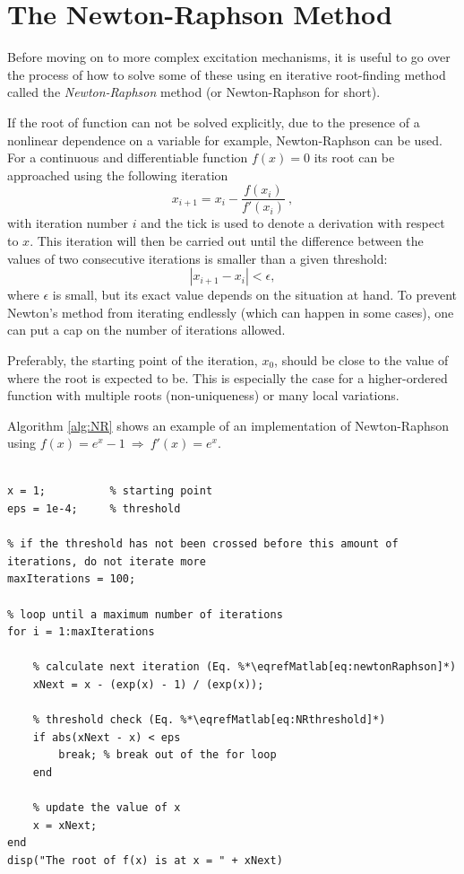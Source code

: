 \section{The Newton-Raphson Method}\label{sec:newtonRaphson}
Before moving on to more complex excitation mechanisms, it is useful to go over the process of how to solve some of these using en iterative root-finding method called the \textit{Newton-Raphson} method (or Newton-Raphson for short). 

If the root of function can not be solved explicitly, due to the presence of a nonlinear dependence on a variable  for example, Newton-Raphson can be used. For a continuous and differentiable function $f(x) = 0$ its root can be approached using the following iteration
\begin{equation}\label{eq:newtonRaphson}
    x_{i+1} = x_i - \frac{f(x_i)}{f'(x_i)}\ ,
\end{equation}
with iteration number $i$ and the tick is used to denote a derivation with respect to $x$.
This iteration will then be carried out until the difference between the values of two consecutive iterations is smaller than a given threshold:
\begin{equation}\label{eq:NRthreshold}
    |x_{i+1} - x_i| < \epsilon,
\end{equation} 
where $\epsilon$ is small, but its exact value depends on the situation at hand. To prevent Newton's method from iterating endlessly (which can happen in some cases), one can put a cap on the number of iterations allowed. 

Preferably, the starting point of the iteration, $x_0$, should be close to the value of where the root is expected to be. This is especially the case for a higher-ordered function with multiple roots (non-uniqueness) or many local variations. 

Algorithm \ref{alg:NR} shows an example of an implementation of Newton-Raphson using $f(x) = e^x -1\ \Rightarrow\ f'(x) = e^x $.

\setlstMAT
\begin{lstlisting}[caption={Example of an implementation of the Newton-Raphson method using $f(x) = e^{x} - 1$.}, label=alg:NR]
% An example of the Newton Raphson method using f(x) = exp(x) - 1

x = 1;          % starting point
eps = 1e-4;     % threshold

% if the threshold has not been crossed before this amount of iterations, do not iterate more
maxIterations = 100;    
    
% loop until a maximum number of iterations
for i = 1:maxIterations

    % calculate next iteration (Eq. %*\eqrefMatlab[eq:newtonRaphson]*)
    xNext = x - (exp(x) - 1) / (exp(x));

    % threshold check (Eq. %*\eqrefMatlab[eq:NRthreshold]*)
    if abs(xNext - x) < eps 
        break; % break out of the for loop
    end

    % update the value of x
    x = xNext;
end
disp("The root of f(x) is at x = " + xNext)
\end{lstlisting}

